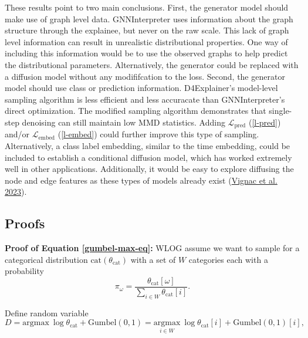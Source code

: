\documentclass[
  11pt,
  letterpaper,
]{article}
\begin{document}
\quad These results point to two main conclusions. First, the generator
model should make use of graph level data. GNNInterpreter uses
information about the graph structure through the explainee, but never
on the raw scale. This lack of graph level information can result in
unrealistic distributional properties. One way of including this
information would be to use the observed graphs to help predict the
distributional parameters. Alternatively, the generator could be
replaced with a diffusion model without any modififcation to the loss.
Second, the generator model should use class or prediction information.
D4Explainer's model-level sampling algorithm is less efficient and less
accuracate than GNNInterpreter's direct optimization. The modified
sampling algorithm demonstrates that single-step denoising can still
maintain low MMD statistics. Adding \(\mathcal{L}_\text{pred}\)
(\ref{l-pred}) and/or \(\mathcal{L}_\text{embed}\) (\ref{l-embed}) could
further improve this type of sampling. Alternatively, a class label
embedding, similar to the time embedding, could be included to establish
a conditional diffusion model, which has worked extremely well in other
applications. Additionally, it would be easy to explore diffusing the
node and edge features as these types of models already exist
(\protect\hyperlink{ref-Vignac_Krawczuk_Siraudin_Wang_Cevher_Frossard_2023}{Vignac
et al. 2023}).

\hypertarget{sec-proof}{%
\subsection{Proofs}\label{sec-proof}}

\textbf{Proof of Equation \ref{gumbel-max-eq}:} WLOG assume we want to
sample for a categorical distribution \(\text{cat}(\theta_\text{cat})\)
with a set of \(W\) categories each with a probability \[
\pi_\omega = \dfrac{\theta_\text{cat}[\omega]}{\sum_{i \in W}\theta_\text{cat}[i]}.
\]

Define random variable \[
D = \text{argmax} \ \log \theta_\text{cat} + \text{Gumbel}(0, 1) = \underset{i \in W}{\text{argmax}} \ \log \theta_\text{cat}[i] + \text{Gumbel}(0, 1)[i], 
\]
\end{document}
